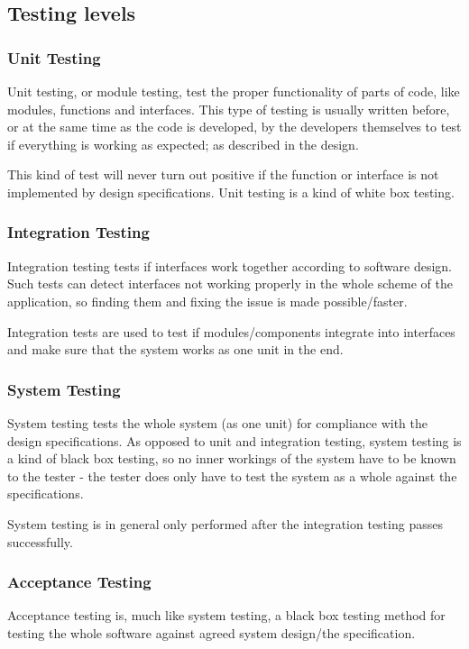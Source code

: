 \documentclass[11pt,a4paper,oneside,svgnames]{report}
\begin{document}
\subsection{Testing levels}
\subsubsection{Unit Testing}
Unit testing, or module testing, test the proper functionality of parts of code, like modules, functions and interfaces. This type of testing is usually written before, or at the same time as the code is developed, by the developers themselves to test if everything is working as expected; as described in the design.

This kind of test will never turn out positive if the function or interface is not implemented by design specifications. Unit testing is a kind of white box testing.

\subsubsection{Integration Testing}
Integration testing tests if interfaces work together according to software design. Such tests can detect interfaces not working properly in the whole scheme of the application, so finding them and fixing the issue is made possible/faster.

Integration tests are used to test if modules/components integrate into interfaces and make sure that the system works as one unit in the end.

\subsubsection{System Testing}
System testing tests the whole system (as one unit) for compliance with the design specifications. As opposed to unit and integration testing, system testing is a kind of black box testing, so no inner workings of the system have to be known to the tester - the tester does only have to test the system as a whole against the specifications.

System testing is in general only performed after the integration testing passes successfully.

\subsubsection{Acceptance Testing}
Acceptance testing is, much like system testing, a black box testing method for testing the whole software against agreed system design/the specification.
\end{document}
